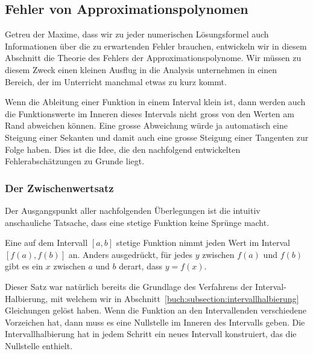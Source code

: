 \subsection{Fehler von Approximationspolynomen
\label{buch:section:interpolation:fehler}}
Getreu der Maxime, dass wir zu jeder numerischen Lösungsformel auch
Informationen über die zu erwartenden Fehler brauchen, entwickeln
wir in diesem Abschnitt die Theorie des Fehlers der Approximationspolynome.
Wir müssen zu diesem Zweck einen kleinen Ausflug in die Analysis unternehmen
in einen Bereich, der im Unterricht manchmal etwas zu kurz kommt.

Wenn die Ableitung einer Funktion in einem Interval klein ist,
dann werden auch die Funktionswerte im Inneren dieses Intervals
nicht gross von den Werten am Rand abweichen können.
Eine grosse Abweichung würde ja automatisch eine Steigung einer Sekanten
und damit auch eine grosse Steigung einer Tangenten zur Folge haben.
Dies ist die Idee, die den nachfolgend entwickelten Fehlerabschätzungen
zu Grunde liegt.

\subsubsection{Der Zwischenwertsatz}
Der Ausgangspunkt aller nachfolgenden Überlegungen ist die intuitiv
anschauliche Tatsache, dass eine stetige Funktion keine Sprünge macht.

\begin{satz}
Eine auf dem Intervall $[a,b]$ stetige Funktion nimmt jeden Wert im
Interval $[f(a),f(b)]$ an.
Anders ausgedrückt, für jedes $y$ zwischen $f(a)$ und $f(b)$ gibt es ein 
$x$ zwischen $a$ und $b$ derart, dass $y=f(x)$.
\end{satz}

Dieser Satz war natürlich bereits die Grundlage des Verfahrens der
Interval-Halbierung, mit welchem wir in
Abschnitt~\ref{buch:subsection:intervallhalbierung}
Gleichungen gelöst haben.
Wenn die Funktion an den Intervallenden verschiedene Vorzeichen hat,
dann muss es eine Nullstelle im Inneren des Intervalls geben.
Die Intervallhalbierung hat in jedem Schritt ein neues Intervall
konstruiert, das die Nullstelle enthielt.

